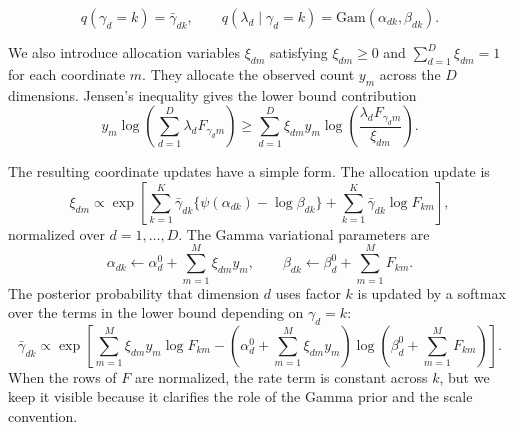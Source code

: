\documentclass[11pt]{article}
\newcommand{\Gam}{\mathrm{Gam}}
\theoremstyle{plain}
\theoremstyle{definition}
\begin{document}
\begin{equation}
  q(\gamma_d=k)=\bar{\gamma}_{dk},
  \qquad
  q(\lambda_d \mid \gamma_d=k)=\Gam(\alpha_{dk},\beta_{dk}).
\end{equation}

We also introduce allocation variables $\xi_{dm}$ satisfying
$\xi_{dm}\geq 0$ and $\sum_{d=1}^D \xi_{dm}=1$ for each coordinate $m$. They
allocate the observed count $y_m$ across the $D$ dimensions. Jensen's inequality
gives the lower bound contribution
\[
  y_m \log\left(\sum_{d=1}^D \lambda_d F_{\gamma_d m}\right)
  \geq
  \sum_{d=1}^D
  \xi_{dm}y_m
  \log\left(\frac{\lambda_d F_{\gamma_d m}}{\xi_{dm}}\right).
\]

The resulting coordinate updates have a simple form. The allocation update is
\begin{equation}
  \xi_{dm}
  \propto
  \exp\left[
    \sum_{k=1}^K \bar{\gamma}_{dk}
    \{\psi(\alpha_{dk})-\log\beta_{dk}\}
    +
    \sum_{k=1}^K \bar{\gamma}_{dk}\log F_{km}
  \right],
  \label{eq:ps-xi-update}
\end{equation}
normalized over $d=1,\ldots,D$. The Gamma variational parameters are
\begin{equation}
  \alpha_{dk}
  \leftarrow
  \alpha_d^0+\sum_{m=1}^M \xi_{dm}y_m,
  \qquad
  \beta_{dk}
  \leftarrow
  \beta_d^0+\sum_{m=1}^M F_{km}.
  \label{eq:ps-gamma-update}
\end{equation}
The posterior probability that dimension $d$ uses factor $k$ is updated by a
softmax over the terms in the lower bound depending on $\gamma_d=k$:
\begin{equation}
  \bar{\gamma}_{dk}
  \propto
  \exp\left[
    \sum_{m=1}^M \xi_{dm}y_m \log F_{km}
    -
    \left(\alpha_d^0+\sum_{m=1}^M \xi_{dm}y_m\right)
    \log\left(\beta_d^0+\sum_{m=1}^M F_{km}\right)
  \right].
  \label{eq:ps-selection-update}
\end{equation}
When the rows of $F$ are normalized, the rate term is constant across $k$, but
we keep it visible because it clarifies the role of the Gamma prior and the
scale convention.
\end{document}
